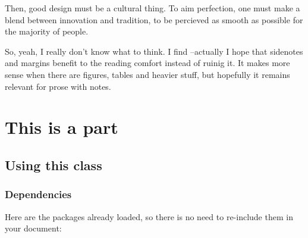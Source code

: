 \documentclass[
    11pt,
]{tufte-style-thesis}
\begin{document}
Then, good design must be a cultural thing. To aim perfection, one must make a blend between innovation and tradition, to be percieved as smooth as possible for the majority of people.

So, yeah, I really don't know what to think. I find --actually I hope that sidenotes and margins benefit to the reading comfort instead of ruinig it. It makes more sense when there are figures, tables and heavier stuff, but hopefully it remains relevant for prose with notes.


\part{This is a part}

\chapter{Using this class}

\section{Dependencies}

Here are the packages already loaded, so there is no need to re-include them in your document:
\end{document}
